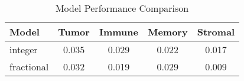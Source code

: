 \begin{table}[h!]
\centering
\caption{Model Performance Comparison}
\label{tab:performance}
\begin{tabular}{|l|c|c|c|c|}
\hline
Model & Tumor & Immune & Memory & Stromal \\
\hline
integer & 0.035 & 0.029 & 0.022 & 0.017 \\
fractional & 0.032 & 0.019 & 0.029 & 0.009 \\
\hline
\end{tabular}
\end{table}
